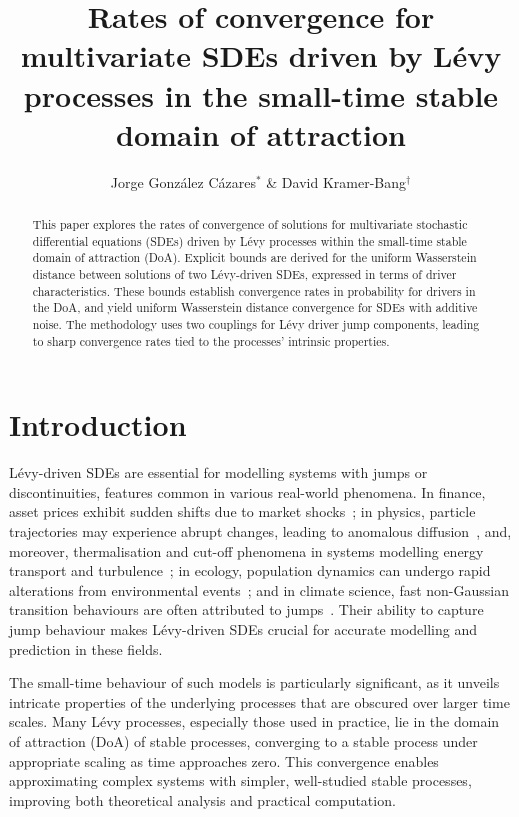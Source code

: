 \documentclass[en,oneside,bbfont,article]{amsart}
\title[Rates of convergence for multivariate SDEs driven by L\'evy processes in small-time]{Rates of convergence for multivariate SDEs driven by L\'evy processes in the small-time stable domain of attraction}
\author{Jorge Gonz\'alez C\'azares$^{*}$ \& David Kramer-Bang$^{\dag}$}
\theoremstyle{remark}
\theoremstyle{definition}
\theoremstyle{definition}
\newcommand\1{\mathds{1}}
\begin{document}
\begin{abstract}
This paper explores the rates of convergence of solutions for multivariate stochastic differential equations (SDEs) driven by L\'evy processes within the small-time stable domain of attraction (DoA). Explicit bounds are derived for the uniform Wasserstein distance between solutions of two Lévy-driven SDEs, expressed in terms of driver characteristics. These bounds establish convergence rates in probability for drivers in the DoA, and yield uniform Wasserstein distance convergence for SDEs with additive noise. The methodology uses two couplings for Lévy driver jump components, leading to sharp convergence rates tied to the processes' intrinsic properties.
\end{abstract}



\maketitle


\section{Introduction}

Lévy-driven SDEs are essential for modelling systems with jumps or discontinuities, features common in various real-world phenomena. In finance, asset prices exhibit sudden shifts due to market shocks~\cite{tankov2015financial}; in physics, particle trajectories may experience abrupt changes, leading to anomalous diffusion~\cite{MR1809268}, and, moreover, thermalisation and cut-off phenomena in systems modelling energy transport and turbulence~\cite{MR4307706,MR4791608}; in ecology, population dynamics can undergo rapid alterations from environmental events~\cite{LevinEco}; and in climate science, fast non-Gaussian transition behaviours are often attributed to jumps~\cite{climate}. Their ability to capture jump behaviour makes Lévy-driven SDEs crucial for accurate modelling and prediction in these fields.


The small-time behaviour of such models is particularly significant, as it unveils intricate properties of the underlying processes that are obscured over larger time scales. Many L\'evy processes, especially those used in practice, lie in the domain of attraction (DoA) of stable processes, converging to a stable process under appropriate scaling as time approaches zero. This convergence enables approximating complex systems with simpler, well-studied stable processes, improving both theoretical analysis and practical computation.
\end{document}
